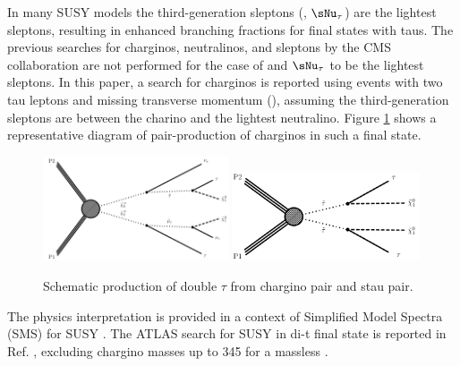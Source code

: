 In many SUSY models \cite{Martin:1997ns} the third-generation sleptons (\sTau, $\sNu_\tau$) are the lightest sleptons, 
resulting in enhanced branching fractions for final states with taus. The previous searches for charginos, neutralinos, 
and sleptons by the CMS collaboration \cite{Khachatryan:2014qwa} are not performed for the case of \stau and $\sNu_\tau$
to be the lightest sleptons. In this paper, a search for charginos is reported using events with two tau leptons and 
missing transverse momentum (\MPT), assuming the third-generation sleptons are between the charino and the lightest neutralino. 
Figure \ref{fig:Productions} shows a representative diagram of pair-production of charginos in such a final state. 
\begin{figure}[!Hhtb]
\centering
\includegraphics[width=0.49\textwidth]{Introductionfigs/TChipmSlepSnu.pdf}
\includegraphics[width=0.49\textwidth]{Introductionfigs/TSlepSlep.pdf}
\caption{Schematic production of double $\tau$ from chargino pair and stau pair.}
\label{fig:Productions}
\end{figure}
The physics interpretation is provided in a context of Simplified Model Spectra (SMS) for SUSY \cite{Alwall:2008ag,alves:sms}.
The ATLAS search for SUSY in di-t final state is reported in Ref. \cite{Aad:2014yka}, excluding chargino masses up to 345 \GeV 
for a massless \PSGczDo.





